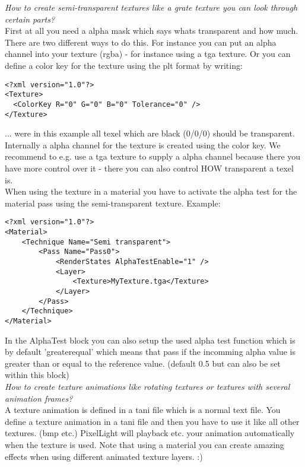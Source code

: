 \emph{How to create semi-transparent textures like a grate texture you can look through certain parts?}\\
First at all you need a alpha mask which says whats transparent and how much.
There are two different ways to do this. For instance you can put an alpha channel into your
texture (rgba) - for instance using a tga texture. Or you can define a color key for the texture
using the plt format by writing:\\

\begin{lstlisting}[caption=plt-file color key]
<?xml version="1.0"?>
<Texture>
  <ColorKey R="0" G="0" B="0" Tolerance="0" />
</Texture>
\end{lstlisting}

... were in this example all texel which are black (0/0/0) should be transparent. Internally a
alpha channel for the texture is created using the color key. We recommend to e.g. use a tga
texture to supply a alpha channel because there you have more control over it - there you can
also control HOW transparent a texel is.\\
    
When using the texture in a material you have to activate the alpha test for the material pass
using the semi-transparent texture. Example:\\

\begin{lstlisting}[caption=Semi-transparent material]
<?xml version="1.0"?>
<Material>
    <Technique Name="Semi transparent">
        <Pass Name="Pass0">
            <RenderStates AlphaTestEnable="1" />
            <Layer>
                <Texture>MyTexture.tga</Texture>
            </Layer>
        </Pass>
    </Technique>
</Material>
\end{lstlisting}

In the AlphaTest block you can also setup the used alpha test function which is by default 'greaterequal' 
which means that pass if the incomming alpha value is greater than or equal to the reference value.
(default 0.5 but can also be set within this block)\\


\emph{How to create texture animations like rotating textures or textures with several animation frames?}\\
A texture animation is defined in a tani file which is a normal text file. You define a texture
animation in a tani file and then you have to use it like all other textures. (bmp etc.) PixelLight
will playback etc. your animation automatically when the texture is used. Note that using a material
you can create amazing effects when using different animated texture layers. :)\\


